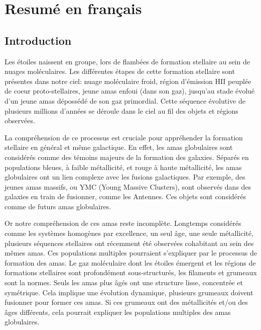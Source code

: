 \chapter{Resum\'e en fran\c{c}ais}
\minitoc

\section{Introduction}
 Les \'etoiles naissent en groupe, lors de flamb\'ees de formation stellaire au sein de nuages mol\'eculaires. Les diff\'erentes \'etapes de cette formation stellaire sont pr\'esentes dans notre ciel: nuage mol\'eculaire froid, r\'egion d'\'emission HII peupl\'ee de coeur proto-stellaires, jeune amas enfoui (dans son gaz), jusqu'au stade \'evolu\'e d'un jeune amas d\'eposs\'ed\'e de son gaz primordial. Cette s\'equence \'evolutive de plusieurs millions d'ann\'ees se d\'eroule dans le ciel au fil des objets et r\'egions observ\'ees. 
 
La compr\'ehension de ce processus est cruciale pour appr\'ehender la formation stellaire en g\'en\'eral et m\^eme galactique. En effet, les amas globulaires sont consid\'er\'es comme des t\'emoins majeurs de la formation des galaxies. S\'epar\'es en populations bleues, \`a faible m\'etallicit\'e, et rouge \`a haute m\'etallicit\'e, les amas globulaires ont un lien complexe avec les fusions galactiques. Par exemple, des jeunes amas massifs, ou YMC (Young Massive Clusters), sont observ\'es dans des galaxies en train de fusionner, comme les Antennes. Ces objets sont consid\'er\'es comme de futurs amas globulaires.

Or notre compr\'ehension de ces amas reste incompl\`ete. Longtemps consid\'er\'es comme les syst\`emes homog\`enes par excellence, un seul \^age, une seule m\'etallicit\'e, plusieurs s\'equences stellaires ont r\'ecemment \'et\'e observ\'ees cohabitant au sein des m\^emes amas. Ces populations multiples pourraient s'expliquer par le processus de formation des amas. Le gaz mol\'eculaire dont les \'etoiles \'emergent et les r\'egions de formations stellaires sont profond\'ement sous-structur\'es, les filaments et grumeaux sont la normes. Seuls les amas plus \^ag\'es ont une structure lisse, concentr\'ee et sym\'etrique. Cela implique une \'evolution dynamique, plusieurs grumeaux doivent fusionner pour former ces amas. Si ces grumeaux ont des m\'etallicit\'es et/ou des \^ages diff\'erents, cela pourrait expliquer les populations multiples des amas globulaires.



